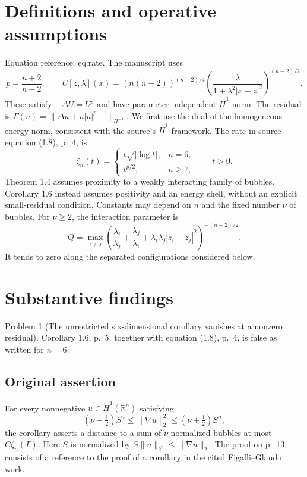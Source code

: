 \documentclass[10pt]{article}
\begin{document}
\section*{Definitions and operative assumptions}
Equation reference: eq:rate. The manuscript uses \[p=\frac{n+2}{n-2},\qquad
U[z,\lambda](x)=(n(n-2))^{(n-2)/4}
 \left(\frac{\lambda}{1+\lambda^2|x-z|^2}\right)^{(n-2)/2}.\] These satisfy \(-\Delta U=U^p\) and have parameter-independent \(\dot H^1\) norm. The residual is \(\Gamma(u)=\|\Delta u+u|u|^{p-1}\|_{H^{-1}}\). We first use the dual of the homogeneous energy norm, consistent with the source’s \(\dot H^1\) framework. The rate in source equation (1.8), p. 4, is \[
 \zeta_n(t)=
 \begin{cases}t\sqrt{|\log t|},&n=6,\\
 t^{p/2},&n\ge7,\end{cases}\qquad t>0.\] Theorem 1.4 assumes proximity to a weakly interacting family of bubbles. Corollary 1.6 instead assumes positivity and an energy shell, without an explicit small-residual condition. Constants may depend on \(n\) and the fixed number \(\nu\) of bubbles. For \(\nu\ge2\), the interaction parameter is \[Q=\max_{i\ne j}\left(\frac{\lambda_i}{\lambda_j}+\frac{\lambda_j}{\lambda_i}
       +\lambda_i\lambda_j|z_i-z_j|^2\right)^{-(n-2)/2}.\] It tends to zero along the separated configurations considered below.\par
\section*{Substantive findings}
Problem 1 (The unrestricted six-dimensional corollary vanishes at a nonzero residual).  Corollary 1.6, p. 5, together with equation (1.8), p. 4, is false as written for \(n=6\).\par
\subsection*{Original assertion}
For every nonnegative \(u\in\dot H^1(\mathbb R^n)\) satisfying \[(\nu-\tfrac12)S^n\le\|\nabla u\|_2^2\le(\nu+\tfrac12)S^n,\] the corollary asserts a distance to a sum of \(\nu\) normalized bubbles at most \(C\zeta_n(\Gamma)\). Here \(S\) is normalized by \(S\|u\|_{2^*}\le\|\nabla u\|_2\). The proof on p. 13 consists of a reference to the proof of a corollary in the cited Figalli–Glaudo work.\par
\end{document}
